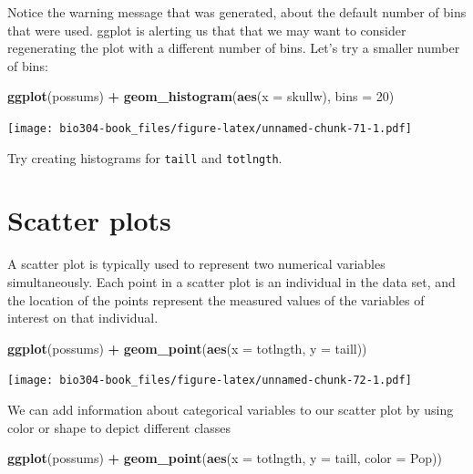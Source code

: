 \documentclass[]{book}
\newenvironment{Shaded}{\begin{snugshade}}{\end{snugshade}}
\newcommand{\DataTypeTok}[1]{\textcolor[rgb]{0.13,0.29,0.53}{#1}}
\newcommand{\DecValTok}[1]{\textcolor[rgb]{0.00,0.00,0.81}{#1}}
\newcommand{\KeywordTok}[1]{\textcolor[rgb]{0.13,0.29,0.53}{\textbf{#1}}}
\newcommand{\NormalTok}[1]{#1}
\newcommand{\OperatorTok}[1]{\textcolor[rgb]{0.81,0.36,0.00}{\textbf{#1}}}
\newcommand{\StringTok}[1]{\textcolor[rgb]{0.31,0.60,0.02}{#1}}
\theoremstyle{definition}
\theoremstyle{definition}
\theoremstyle{definition}
\theoremstyle{remark}
\begin{document}
Notice the warning message that was generated, about the default number
of bins that were used. ggplot is alerting us that that we may want to
consider regenerating the plot with a different number of bins. Let's
try a smaller number of bins:

\begin{Shaded}
\begin{Highlighting}[]
\KeywordTok{ggplot}\NormalTok{(possums) }\OperatorTok{+}\StringTok{ }\KeywordTok{geom_histogram}\NormalTok{(}\KeywordTok{aes}\NormalTok{(}\DataTypeTok{x =}\NormalTok{ skullw), }\DataTypeTok{bins =} \DecValTok{20}\NormalTok{)}
\end{Highlighting}
\end{Shaded}

\texttt{[image: bio304-book\_files/figure-latex/unnamed-chunk-71-1.pdf]}

Try creating histograms for \texttt{taill} and \texttt{totlngth}.

\hypertarget{scatter-plots}{%
\section{Scatter plots}\label{scatter-plots}}

A scatter plot is typically used to represent two numerical variables
simultaneously. Each point in a scatter plot is an individual in the
data set, and the location of the points represent the measured values
of the variables of interest on that individual.

\begin{Shaded}
\begin{Highlighting}[]
\KeywordTok{ggplot}\NormalTok{(possums) }\OperatorTok{+}\StringTok{ }\KeywordTok{geom_point}\NormalTok{(}\KeywordTok{aes}\NormalTok{(}\DataTypeTok{x =}\NormalTok{ totlngth, }\DataTypeTok{y =}\NormalTok{ taill))}
\end{Highlighting}
\end{Shaded}

\texttt{[image: bio304-book\_files/figure-latex/unnamed-chunk-72-1.pdf]}

We can add information about categorical variables to our scatter plot
by using color or shape to depict different classes

\begin{Shaded}
\begin{Highlighting}[]
\KeywordTok{ggplot}\NormalTok{(possums) }\OperatorTok{+}\StringTok{ }
\StringTok{  }\KeywordTok{geom_point}\NormalTok{(}\KeywordTok{aes}\NormalTok{(}\DataTypeTok{x =}\NormalTok{ totlngth, }\DataTypeTok{y =}\NormalTok{ taill, }\DataTypeTok{color =}\NormalTok{ Pop))}
\end{Highlighting}
\end{Shaded}
\end{document}
